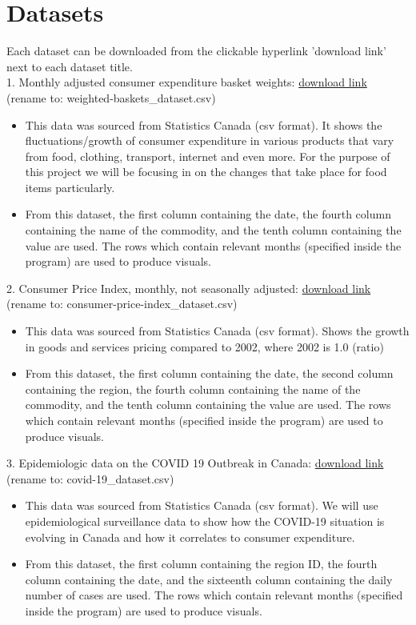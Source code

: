 \documentclass[fontsize=11pt]{article}
\newcommand{\blue}[1]{\textcolor{blue}{#1}}
\begin{document}
\section*{Datasets}
Each dataset can be downloaded from the clickable hyperlink 'download link' next to each dataset title.\\

1. Monthly adjusted consumer expenditure basket weights: \blue{\href{https://www150.statcan.gc.ca/n1/tbl/csv/18100264-eng.zip}{download link}} (rename to: weighted-baskets\_dataset.csv)
\begin{itemize}
\item This data was sourced from Statistics Canada (csv format). It shows the fluctuations/growth of consumer expenditure in various products that vary from food, clothing, transport, internet and even more. For the purpose of this project we will be focusing in on the changes that take place for food items particularly.
\item From this dataset, the first column containing the date, the fourth column containing the name of the commodity, and the tenth column containing the value are used. The rows which contain relevant months (specified inside the program) are used to produce visuals.
\end{itemize}

2. Consumer Price Index, monthly, not seasonally adjusted: \blue{\href{https://www150.statcan.gc.ca/n1/tbl/csv/18100004-eng.zip}{download link}} (rename to: consumer-price-index\_dataset.csv)
\begin{itemize}
\item This data was sourced from Statistics Canada (csv format). Shows the growth in goods and services pricing compared to 2002, where 2002 is 1.0 (ratio)
\item From this dataset, the first column containing the date, the second column containing the region, the fourth column containing the name of the commodity, and the tenth column containing the value are used. The rows which contain relevant months (specified inside the program) are used to produce visuals.
\end{itemize}

3. Epidemiologic data on the COVID 19 Outbreak in Canada: \blue{\href{https://health-infobase.canada.ca/src/data/covidLive/covid19-download.csv}{download link}} (rename to: covid-19\_dataset.csv)
\begin{itemize}
\item This data was sourced from Statistics Canada (csv format). We will use epidemiological surveillance data to show how the COVID-19 situation is evolving in Canada and how it correlates to consumer expenditure.
\item From this dataset, the first column containing the region ID, the fourth column containing the date, and the sixteenth column containing the daily number of cases are used. The rows which contain relevant months (specified inside the program) are used to produce visuals.
\end{itemize}
\end{document}
